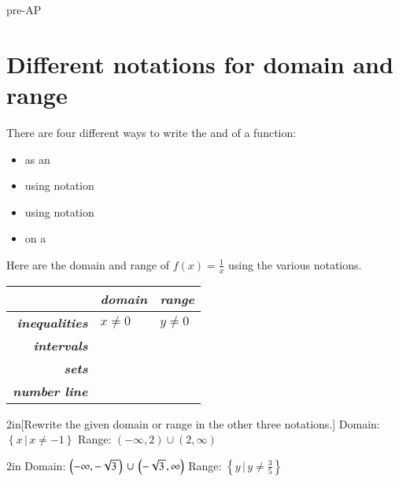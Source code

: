 \begin{taggedblock}{pre-AP}

\section{Different notations for domain and range}

There are four different ways to write the  and  
of a function:
\begin{itemize}[nosep]
    \item as an 
    \item using  notation
    \item using  notation
    \item on a 
\end{itemize}

Here are the domain and range of $f(x) = \frac{1}{x}$ using the various notations.

\begin{myCenteredBox}[width=6in, colback=white,]
\begin{center}
\large
\renewcommand{\arraystretch}{1.5}
\begin{tabular}{r||p{2in}|p{2in}}
                                     & {\bfseries\itshape domain} & {\bfseries\itshape range} \\ \hline
    {\bfseries\itshape inequalities} & $x \neq 0$ & $y \neq 0$ \\
    {\bfseries\itshape intervals}    & & \\
    {\bfseries\itshape sets}         & & \\
    {\bfseries\itshape number line}  & & \\
\end{tabular}
\end{center}
\end{myCenteredBox}


\begin{my2Problems}{2in}[Rewrite the given domain or range in the other three notations.]
    {
        Domain: $\left\{x \, | \, x \neq -1 \right\}$
    }
    {
        Range: $ (-\infty,2) \cup (2,\infty) $
    }
\end{my2Problems}
\begin{my2Problems}{2in}
    {
        Domain: $ \left(-\infty,-\myRoot{3}\right) \,\cup\, \left(-\myRoot{3},\infty\right) $
    }
    {
        Range: $\left\{y \, | \, y \neq \frac{3}{5} \right\}$
    }
\end{my2Problems}

\end{taggedblock}
